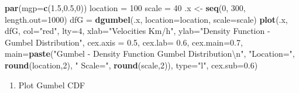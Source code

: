 \documentclass[12pt,oneside]{reedthesis}
\newenvironment{Shaded}{\begin{snugshade}}{\end{snugshade}}
\newcommand{\CharTok}[1]{\textcolor[rgb]{0.31,0.60,0.02}{#1}}
\newcommand{\DataTypeTok}[1]{\textcolor[rgb]{0.13,0.29,0.53}{#1}}
\newcommand{\DecValTok}[1]{\textcolor[rgb]{0.00,0.00,0.81}{#1}}
\newcommand{\FloatTok}[1]{\textcolor[rgb]{0.00,0.00,0.81}{#1}}
\newcommand{\KeywordTok}[1]{\textcolor[rgb]{0.13,0.29,0.53}{\textbf{#1}}}
\newcommand{\NormalTok}[1]{#1}
\newcommand{\StringTok}[1]{\textcolor[rgb]{0.31,0.60,0.02}{#1}}
\providecommand{\tightlist}{%
  \setlength{\itemsep}{0pt}\setlength{\parskip}{0pt}}
\begin{document}
\begin{Shaded}
\begin{Highlighting}[]
\KeywordTok{par}\NormalTok{(}\DataTypeTok{mgp=}\KeywordTok{c}\NormalTok{(}\FloatTok{1.5}\NormalTok{,}\FloatTok{0.5}\NormalTok{,}\DecValTok{0}\NormalTok{))}
\NormalTok{location =}\StringTok{ }\DecValTok{100}
\NormalTok{scale =}\StringTok{ }\DecValTok{40}
\NormalTok{.x <-}\StringTok{ }\KeywordTok{seq}\NormalTok{(}\DecValTok{0}\NormalTok{, }\DecValTok{300}\NormalTok{, }\DataTypeTok{length.out=}\DecValTok{1000}\NormalTok{)}
\NormalTok{dfG =}\StringTok{ }\KeywordTok{dgumbel}\NormalTok{(.x, }\DataTypeTok{location=}\NormalTok{location, }\DataTypeTok{scale=}\NormalTok{scale)}
\KeywordTok{plot}\NormalTok{(.x, dfG, }\DataTypeTok{col=}\StringTok{"red"}\NormalTok{, }\DataTypeTok{lty=}\DecValTok{4}\NormalTok{, }\DataTypeTok{xlab=}\StringTok{"Velocities Km/h"}\NormalTok{, }\DataTypeTok{ylab=}\StringTok{"Density Function - Gumbel Distribution"}\NormalTok{, }\DataTypeTok{cex.axis =} \FloatTok{0.5}\NormalTok{, }\DataTypeTok{cex.lab=} \FloatTok{0.6}\NormalTok{, }\DataTypeTok{cex.main=}\FloatTok{0.7}\NormalTok{,}
 \DataTypeTok{main=}\KeywordTok{paste}\NormalTok{(}\StringTok{"Gumbel - Density Function Gumbel Distribution}\CharTok{\textbackslash{}n}\StringTok{"}\NormalTok{, }\StringTok{"Location="}\NormalTok{, }\KeywordTok{round}\NormalTok{(location,}\DecValTok{2}\NormalTok{), }\StringTok{" Scale="}\NormalTok{, }\KeywordTok{round}\NormalTok{(scale,}\DecValTok{2}\NormalTok{)), }\DataTypeTok{type=}\StringTok{"l"}\NormalTok{, }\DataTypeTok{cex.sub=}\FloatTok{0.6}\NormalTok{)}
\end{Highlighting}
\end{Shaded}
\normalsize
\begin{enumerate}
\def\labelenumi{\arabic{enumi}.}
\setcounter{enumi}{2}
\tightlist
\item
  Plot Gumbel CDF
\end{enumerate}
\tiny
\end{document}
